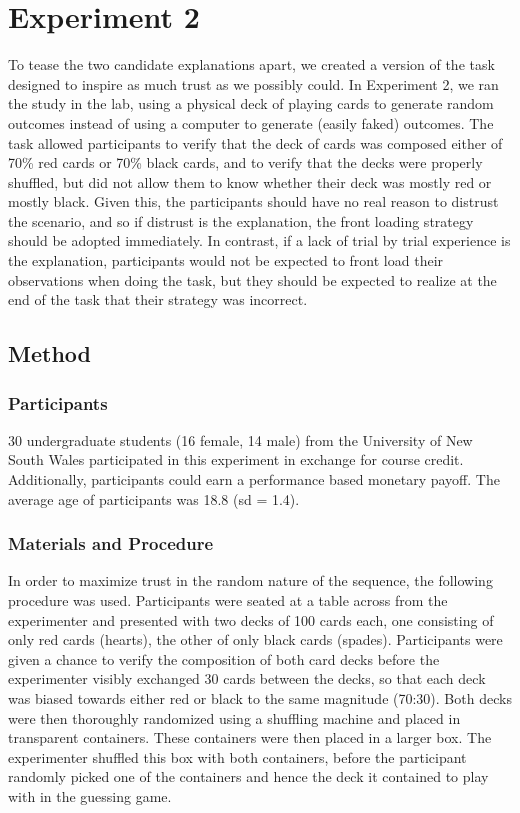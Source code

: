 \documentclass[authoryear]{elsarticle}
\newcommand{\sectionX}[1]{\section{#1}}
\newcommand{\subsectionX}[1]{\subsection{#1}}
\newcommand{\subsubsectionX}[1]{\subsubsection{#1}}
\begin{document}
\sectionX{Experiment 2}

To tease the two candidate explanations apart, we created a version of the task designed to inspire as much trust as we possibly could. In Experiment 2, we ran the study in the lab, using a physical deck of playing cards to generate random outcomes instead of using a computer to generate (easily faked) outcomes. The task allowed participants to verify that the deck of cards was composed either of 70\% red cards or 70\% black cards, and to verify that the decks were properly shuffled, but did not allow them to know whether their deck was mostly red or mostly black. Given this, the participants should have no real reason to distrust the scenario, and so if distrust is the explanation, the front loading strategy should be adopted immediately. In contrast, if a lack of trial by trial experience is the explanation, participants would not be expected to front load their observations when doing the task, but they should be expected to realize at the end of the task that their strategy was incorrect.

\subsectionX{Method}

\subsubsectionX{Participants} 30 undergraduate students (16 female, 14 male) from the University of New South Wales participated in this experiment in exchange for course credit. Additionally, participants could earn a performance based monetary payoff. The average age of participants was 18.8 (sd = 1.4).


\subsubsectionX{Materials and Procedure} In order to maximize trust in the random nature of the sequence, the following procedure was used. Participants were seated at a table across from the experimenter and presented with two decks of 100 cards each, one consisting of only red cards (hearts), the other of only black cards (spades). Participants were given a chance to verify the composition of both card decks before the experimenter visibly exchanged 30 cards between the decks, so that each deck was biased towards either red or black to the same magnitude (70:30). Both decks were then thoroughly randomized using a shuffling machine and placed in transparent containers. These containers were then placed in a larger box. The experimenter shuffled this box with both containers, before the participant randomly picked one of the containers and hence the deck it contained to play with in the guessing game.
\end{document}
